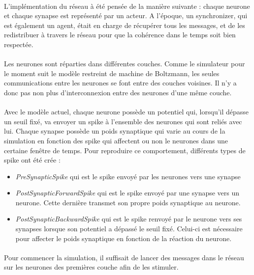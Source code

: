 \documentclass[a4paper,10pt]{article}
\begin{document}
\paragraph{}
L’implémentation du réseau à été pensée de la manière suivante : chaque neurone et chaque synapse est représenté par un acteur. A l’époque, un synchronizer, qui est également  un agent, était en charge de récupérer tous les messages, et de les redistribuer à travers le réseau pour que la cohérence dans le temps soit bien respectée. 

\paragraph{}
Les neurones sont réparties dans différentes couches. Comme le simulateur pour le moment suit le modèle restreint de machine de Boltzmann, les seules communications entre les neurones se font entre des couches voisines. Il n'y a donc pas non plus d’interconnexion entre des neurones d'une même couche.

\paragraph{}
Avec le modèle actuel, chaque neurone possède un potentiel qui, lorsqu'il dépasse un seuil fixé, va envoyer un spike à l'ensemble des neurones qui sont reliés avec lui. Chaque synapse possède un poids synaptique qui varie au cours de la simulation en fonction des spike qui affectent ou non le neurones dans une certaine fenêtre de temps. Pour reproduire ce comportement, différents types de spike ont été crée : 
\begin{itemize}
\item \emph{PreSynapticSpike} qui est le spike envoyé par les neurones vers une synapse
\item \emph{PostSynapticForwardSpike} qui est le spike envoyé par une synapse vers un neurone. Cette dernière transmet son propre poids synaptique au neurone.
\item \emph{PostSynapticBackwardSpike} qui est le spike renvoyé par le neurone vers ses synapses lorsque son potentiel a dépassé le seuil fixé. Celui-ci est nécessaire pour affecter le poids synaptique en fonction de la réaction du neurone.
\end{itemize}

\paragraph{}
Pour commencer la simulation, il suffisait de lancer des messages dans le réseau sur les neurones des premières couche afin de les stimuler.
\end{document}

